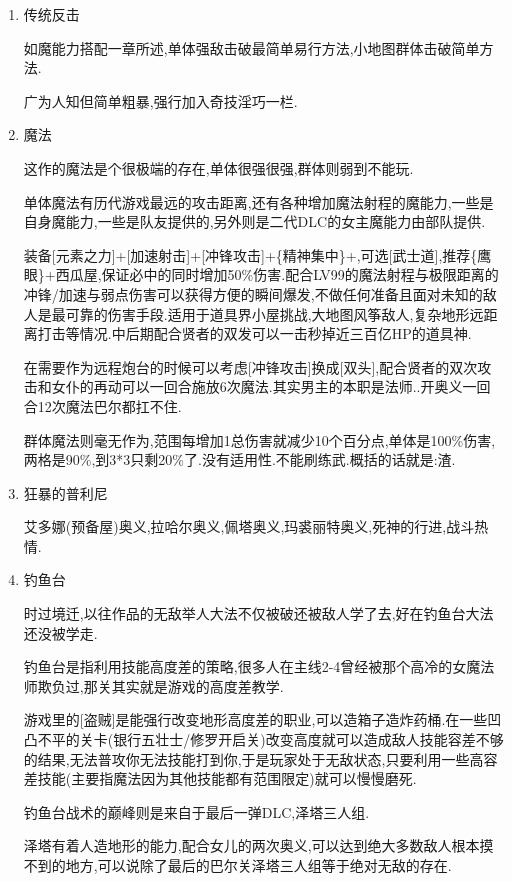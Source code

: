 	\begin{enumerate}

		\item{传统反击}

		如魔能力搭配一章所述,单体强敌击破最简单易行方法,小地图群体击破简单方法.

		广为人知但简单粗暴,强行加入奇技淫巧一栏.

		\item{魔法}

		这作的魔法是个很极端的存在,单体很强很强,群体则弱到不能玩.

		单体魔法有历代游戏最远的攻击距离,还有各种增加魔法射程的魔能力,一些是自身魔能力,一些是队友提供的,另外则是二代DLC的女主魔能力由部队提供.

		装备[元素之力]+[加速射击]+[冲锋攻击]+\{精神集中\}+,可选[武士道],推荐\{鹰眼\}+西瓜屋,保证必中的同时增加50\%伤害.配合LV99的魔法射程与极限距离的冲锋/加速与弱点伤害可以获得方便的瞬间爆发,不做任何准备且面对未知的敌人是最可靠的伤害手段.适用于道具界小屋挑战,大地图风筝敌人,复杂地形远距离打击等情况.中后期配合贤者的双发可以一击秒掉近三百亿HP的道具神.

		在需要作为远程炮台的时候可以考虑[冲锋攻击]换成[双头],配合贤者的双次攻击和女仆的再动可以一回合施放6次魔法.其实男主的本职是法师..开奥义一回合12次魔法巴尔都扛不住.

		群体魔法则毫无作为,范围每增加1总伤害就减少10个百分点,单体是100\%伤害,两格是90\%,到3*3只剩20\%了.没有适用性.不能刷练武.概括的话就是:渣.


		\item{狂暴的普利尼}

		艾多娜(预备屋)奥义,拉哈尔奥义,佩塔奥义,玛裘丽特奥义,死神的行进,战斗热情.

		\newpage
		
		\item{钓鱼台}

		时过境迁,以往作品的无敌举人大法不仅被破还被敌人学了去,好在钓鱼台大法还没被学走.

		钓鱼台是指利用技能高度差的策略,很多人在主线2-4曾经被那个高冷的女魔法师欺负过,那关其实就是游戏的高度差教学.

		游戏里的[盗贼]是能强行改变地形高度差的职业,可以造箱子造炸药桶.在一些凹凸不平的关卡(银行五壮士/修罗开启关)改变高度就可以造成敌人技能容差不够的结果,无法普攻你无法技能打到你,于是玩家处于无敌状态,只要利用一些高容差技能(主要指魔法因为其他技能都有范围限定)就可以慢慢磨死.

		钓鱼台战术的巅峰则是来自于最后一弹DLC,泽塔三人组.

		泽塔有着人造地形的能力,配合女儿的两次奥义,可以达到绝大多数敌人根本摸不到的地方,可以说除了最后的巴尔关泽塔三人组等于绝对无敌的存在.


\end{enumerate}
